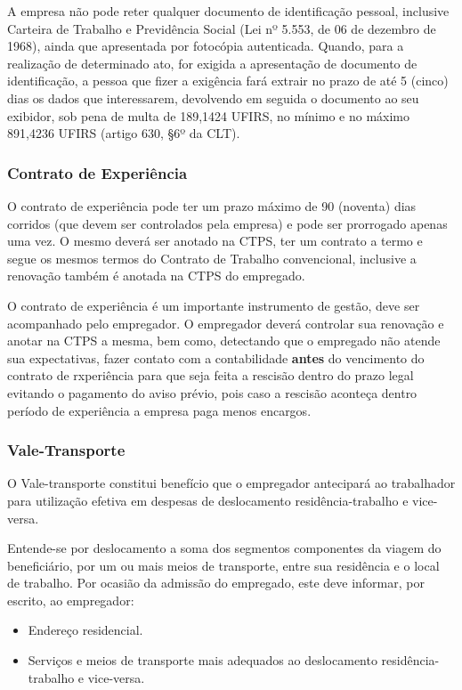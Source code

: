 \documentclass{article}
\begin{document}
\begin{tcolorbox}[title=Atenção!]
  A empresa não pode reter qualquer documento de identificação pessoal, inclusive Carteira de Trabalho e Previdência Social (Lei nº 5.553, de 06 de dezembro de 1968), ainda que apresentada por fotocópia autenticada. Quando, para a realização de determinado ato, for exigida a apresentação de documento de identificação, a pessoa que fizer a exigência fará extrair no prazo de até 5 (cinco) dias os dados que interessarem, devolvendo em seguida o documento ao seu exibidor, sob pena de multa de 189,1424 UFIRS, no mínimo e no máximo 891,4236 UFIRS (artigo 630, §6º da CLT).
\end{tcolorbox}

\subsubsection{Contrato de Experiência}
\label{adm:exp}
O contrato de experiência pode ter um prazo máximo de 90 (noventa) dias corridos (que devem ser controlados pela empresa) e pode ser prorrogado apenas uma vez. O mesmo deverá ser anotado na CTPS, ter um contrato a termo e segue os mesmos termos do Contrato de Trabalho convencional, inclusive a renovação também é anotada na CTPS do empregado.

O contrato de experiência é um importante instrumento de gestão, deve ser acompanhado pelo empregador. O empregador deverá controlar sua renovação e anotar na CTPS a mesma, bem como, detectando que o empregado não atende sua expectativas, fazer contato com a contabilidade \textbf{antes} do vencimento do contrato de rxperiência para que seja feita a rescisão dentro do prazo legal evitando o pagamento do aviso prévio, pois caso a rescisão aconteça dentro período de experiência a empresa paga menos encargos.

\subsubsection{Vale-Transporte}
\label{adm:vt}
O Vale-transporte constitui benefício que o empregador antecipará ao trabalhador para utilização efetiva em despesas de deslocamento residência-trabalho e vice-versa. 

Entende-se por deslocamento a soma dos segmentos componentes da viagem do beneficiário, por um ou mais meios de transporte, entre sua residência e o local de trabalho. Por ocasião da admissão do empregado, este deve informar, por escrito, ao empregador:
\begin{itemize}
  \item Endereço residencial.
  \item Serviços e meios de transporte mais adequados ao deslocamento residência-trabalho e vice-versa.
\end{itemize}
\end{document}
